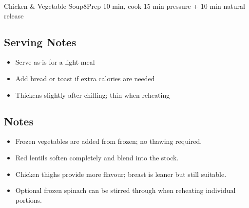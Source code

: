 \begin{recipebox}{Chicken \& Vegetable Soup}{8}{Prep 10 min, cook 15 min pressure + 10 min natural release}
\subsection*{Serving Notes}
\begin{itemize}
    \item Serve as-is for a light meal
    \item Add bread or toast if extra calories are needed
    \item Thickens slightly after chilling; thin when reheating
\end{itemize}

\subsection*{Notes}
\begin{itemize}
    \item Frozen vegetables are added from frozen; no thawing required.
    \item Red lentils soften completely and blend into the stock.
    \item Chicken thighs provide more flavour; breast is leaner but still suitable.
    \item Optional frozen spinach can be stirred through when reheating individual portions.
\end{itemize}
\end{recipebox}
